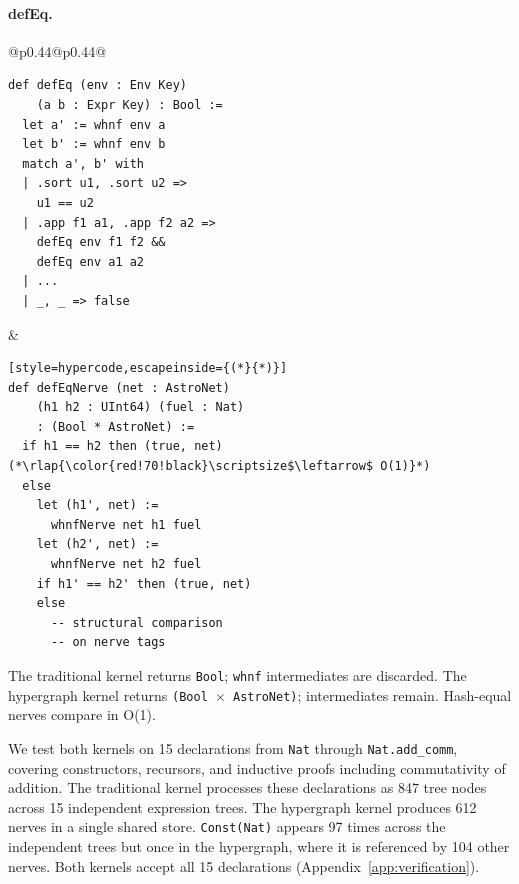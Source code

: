 \paragraph{defEq.}
\begin{center}
\begin{tabular}{@{}p{}@{\hspace{0.02\textwidth}}p{}@{}}
\begin{lstlisting}[style=treecode]
def defEq (env : Env Key)
    (a b : Expr Key) : Bool :=
  let a' := whnf env a
  let b' := whnf env b
  match a', b' with
  | .sort u1, .sort u2 =>
    u1 == u2
  | .app f1 a1, .app f2 a2 =>
    defEq env f1 f2 &&
    defEq env a1 a2
  | ...
  | _, _ => false
\end{lstlisting}
&
\begin{lstlisting}[style=hypercode,escapeinside={(*}{*)}]
def defEqNerve (net : AstroNet)
    (h1 h2 : UInt64) (fuel : Nat)
    : (Bool * AstroNet) :=
  if h1 == h2 then (true, net) (*\rlap{\color{red!70!black}\scriptsize$\leftarrow$ O(1)}*)
  else
    let (h1', net) :=
      whnfNerve net h1 fuel
    let (h2', net) :=
      whnfNerve net h2 fuel
    if h1' == h2' then (true, net)
    else
      -- structural comparison
      -- on nerve tags
\end{lstlisting}
\end{tabular}
\end{center}
\noindent The traditional kernel returns \texttt{Bool}; \texttt{whnf} intermediates are discarded.  The hypergraph kernel returns \texttt{(Bool $\times$ AstroNet)}; intermediates remain.  Hash-equal nerves compare in O(1).

We test both kernels on 15 declarations from \texttt{Nat} through \texttt{Nat.add\_comm}, covering constructors, recursors, and inductive proofs including commutativity of addition.  The traditional kernel processes these declarations as 847 tree nodes across 15 independent expression trees.  The hypergraph kernel produces 612 nerves in a single shared store.  \texttt{Const(Nat)} appears 97 times across the independent trees but once in the hypergraph, where it is referenced by 104 other nerves.  Both kernels accept all 15 declarations (Appendix~\ref{app:verification}).
